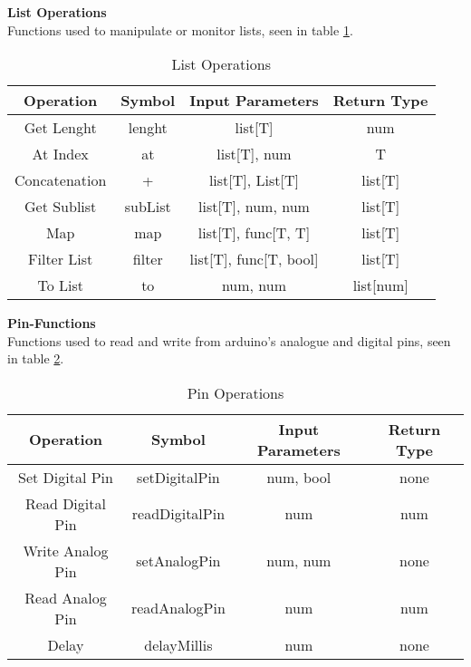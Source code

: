 \textbf{List Operations}\\
Functions used to manipulate or monitor lists, seen in table \ref{tbl:list}.
\begin{table}[h]
	\centering
	\caption{List Operations}
	\label{tbl:list}
	\begin{tabular}{|c|c|c|c|}
		\hline
		Operation     & Symbol  & Input Parameters            & Return Type \\ \hline
		Get Lenght    & lenght  & list{[}T{]}                 & num         \\ \hline
		At Index      & at      & list{[}T{]}, num            & T           \\ \hline
		Concatenation & +       & list{[}T{]}, List{[}T{]}    & list{[}T{]} \\ \hline
		Get Sublist   & subList & list{[}T{]}, num, num       & list{[}T{]} \\ \hline
		Map           & map     & list{[}T{]}, func[T, T]     & list{[}T{]} \\ \hline
		Filter List   & filter  & list{[}T{]}, func[T, bool]  & list{[}T{]} \\ \hline
		To List       & to      & num, num                    & list[num]   \\ \hline
	\end{tabular}
\end{table}
\newpage

\textbf{Pin-Functions}\\
Functions used to read and write from arduino's analogue and digital pins, seen in table \ref{tbl:pins}.
\begin{table}[h]
	\centering
	\caption{Pin Operations}
	\label{tbl:pins}
	\begin{tabular}{|c|c|c|c|}
		\hline
		Operation                                                      & Symbol         & Input Parameters & Return Type \\ \hline
		Set Digital Pin                                                & setDigitalPin  & num, bool        & none        \\ \hline
		Read Digital Pin                                               & readDigitalPin & num              & num         \\ \hline
		Write Analog Pin                                               & setAnalogPin   & num, num         & none        \\ \hline
		Read Analog Pin                                                & readAnalogPin  & num              & num         \\ \hline
		Delay                                                          & delayMillis    & num              & none        \\ \hline
	\end{tabular}
\end{table}

